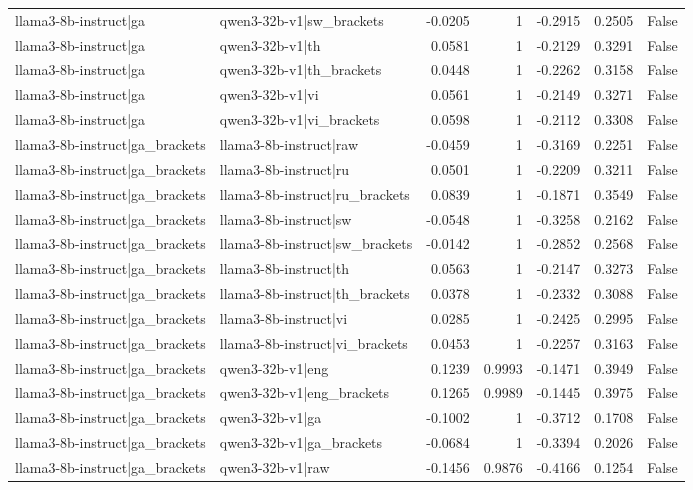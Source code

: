 \begin{table}
\begin{tabular}{l l r r r r l}
llama3-8b-instruct|ga & qwen3-32b-v1|sw_brackets & -0.0205 & 1 & -0.2915 & 0.2505 & False \\
llama3-8b-instruct|ga & qwen3-32b-v1|th & 0.0581 & 1 & -0.2129 & 0.3291 & False \\
llama3-8b-instruct|ga & qwen3-32b-v1|th_brackets & 0.0448 & 1 & -0.2262 & 0.3158 & False \\
llama3-8b-instruct|ga & qwen3-32b-v1|vi & 0.0561 & 1 & -0.2149 & 0.3271 & False \\
llama3-8b-instruct|ga & qwen3-32b-v1|vi_brackets & 0.0598 & 1 & -0.2112 & 0.3308 & False \\
llama3-8b-instruct|ga_brackets & llama3-8b-instruct|raw & -0.0459 & 1 & -0.3169 & 0.2251 & False \\
llama3-8b-instruct|ga_brackets & llama3-8b-instruct|ru & 0.0501 & 1 & -0.2209 & 0.3211 & False \\
llama3-8b-instruct|ga_brackets & llama3-8b-instruct|ru_brackets & 0.0839 & 1 & -0.1871 & 0.3549 & False \\
llama3-8b-instruct|ga_brackets & llama3-8b-instruct|sw & -0.0548 & 1 & -0.3258 & 0.2162 & False \\
llama3-8b-instruct|ga_brackets & llama3-8b-instruct|sw_brackets & -0.0142 & 1 & -0.2852 & 0.2568 & False \\
llama3-8b-instruct|ga_brackets & llama3-8b-instruct|th & 0.0563 & 1 & -0.2147 & 0.3273 & False \\
llama3-8b-instruct|ga_brackets & llama3-8b-instruct|th_brackets & 0.0378 & 1 & -0.2332 & 0.3088 & False \\
llama3-8b-instruct|ga_brackets & llama3-8b-instruct|vi & 0.0285 & 1 & -0.2425 & 0.2995 & False \\
llama3-8b-instruct|ga_brackets & llama3-8b-instruct|vi_brackets & 0.0453 & 1 & -0.2257 & 0.3163 & False \\
llama3-8b-instruct|ga_brackets & qwen3-32b-v1|eng & 0.1239 & 0.9993 & -0.1471 & 0.3949 & False \\
llama3-8b-instruct|ga_brackets & qwen3-32b-v1|eng_brackets & 0.1265 & 0.9989 & -0.1445 & 0.3975 & False \\
llama3-8b-instruct|ga_brackets & qwen3-32b-v1|ga & -0.1002 & 1 & -0.3712 & 0.1708 & False \\
llama3-8b-instruct|ga_brackets & qwen3-32b-v1|ga_brackets & -0.0684 & 1 & -0.3394 & 0.2026 & False \\
llama3-8b-instruct|ga_brackets & qwen3-32b-v1|raw & -0.1456 & 0.9876 & -0.4166 & 0.1254 & False \\

\end{tabular}
\end{table}
